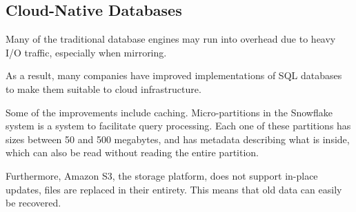 \subsection{Cloud-Native Databases}
Many of the traditional database engines may run into overhead due to heavy I/O traffic, especially when mirroring.

As a result, many companies have improved implementations of SQL databases to make them suitable to cloud infrastructure.

Some of the improvements include caching. Micro-partitions in the Snowflake system is a system to facilitate query processing.
Each one of these partitions has sizes between 50 and 500 megabytes, and has metadata describing what is inside, which can also be read without reading the entire partition.

Furthermore, Amazon S3, the storage platform, does not support in-place updates, files are replaced in their entirety.
This means that old data can easily be recovered.
